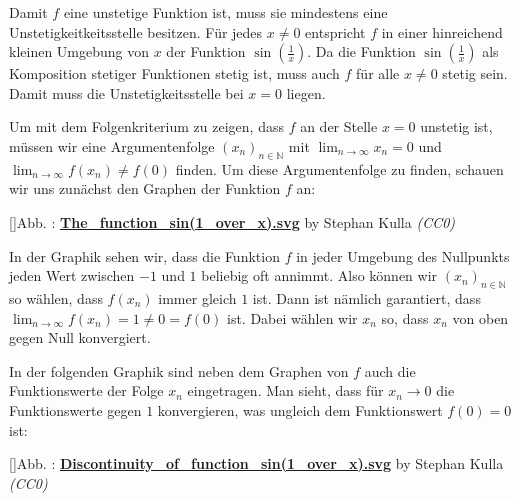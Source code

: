 \documentclass[fontsize=9pt,
               parskip=half-,
               DIV=14,
               listof=chapterentry,
               tocflat]{scrbook}
\newcounter{imagelabel}
\begin{document}
\begin{solutionprocess*}
Damit $f$ eine unstetige Funktion ist, muss sie mindestens eine Unstetigkeitkeitsstelle besitzen. Für jedes $x\neq 0$ entspricht $f$ in einer hinreichend kleinen Umgebung von $x$ der Funktion $\sin \left({\tfrac {1}{x}}\right)$. Da die Funktion $\sin \left({\tfrac {1}{x}}\right)$ als Komposition stetiger Funktionen stetig ist, muss auch $f$ für alle $x\neq 0$ stetig sein. Damit muss die Unstetigkeitsstelle bei $x=0$ liegen.

Um mit dem Folgenkriterium zu zeigen, dass $f$ an der Stelle $x=0$ unstetig ist, müssen wir eine Argumentenfolge $(x_{n})_{n\in \mathbb {N} }$ mit $\lim _{n\to \infty }x_{n}=0$ und $\lim _{n\to \infty }f(x_{n})\neq f(0)$ finden. Um diese Argumentenfolge zu finden, schauen wir uns zunächst den Graphen der Funktion $f$ an:

[]{Abb. : \protect\href{https://commons.wikimedia.org/wiki/File:The_function_sin(1_over_x).svg}{\textbf{The\allowbreak\_function\allowbreak\_sin(1\allowbreak\_over\allowbreak\_x).svg}} by Stephan Kulla \textit{(CC0)}}\begin{center}
\end{center}

In der Graphik sehen wir, dass die Funktion $f$ in jeder Umgebung des Nullpunkts jeden Wert zwischen $-1$ und $1$ beliebig oft annimmt. Also können wir $(x_{n})_{n\in \mathbb {N} }$ so wählen, dass $f(x_{n})$ immer gleich $1$ ist. Dann ist nämlich garantiert, dass $\lim _{n\to \infty }f(x_{n})=1\neq 0=f(0)$ ist. Dabei wählen wir $x_{n}$ so, dass $x_{n}$ von oben gegen Null konvergiert.

In der folgenden Graphik sind neben dem Graphen von $f$ auch die Funktionswerte der Folge $x_{n}$ eingetragen. Man sieht, dass für $x_{n}\to 0$ die Funktionswerte gegen $1$ konvergieren, was ungleich dem Funktionswert $f(0)=0$ ist:

[]{Abb. : \protect\href{https://commons.wikimedia.org/wiki/File:Discontinuity_of_function_sin(1_over_x).svg}{\textbf{Discontinuity\allowbreak\_of\allowbreak\_function\allowbreak\_sin(1\allowbreak\_over\allowbreak\_x).svg}} by Stephan Kulla \textit{(CC0)}}\begin{center}
\end{center}


\end{solutionprocess*}
\end{document}
